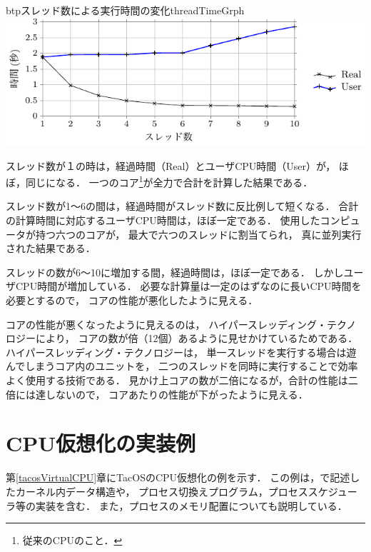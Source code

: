 \begin{myfig}{btp}{スレッド数による実行時間の変化}{threadTimeGrph}
  \includegraphics[scale=1.0]{Tbl/threadTimeGrph.pdf}
\end{myfig}

スレッド数が１の時は，経過時間（Real）とユーザCPU時間（User）が，
ほぼ，同じになる．
一つのコア\footnote{従来のCPUのこと．}が全力で合計を計算した結果である．

スレッド数が1〜6の間は，経過時間がスレッド数に反比例して短くなる．
合計の計算時間に対応するユーザCPU時間は，ほぼ一定である．
使用したコンピュータが持つ六つのコアが，
最大で六つのスレッドに割当てられ，
真に並列実行された結果である．

スレッドの数が6〜10に増加する間，経過時間は，ほぼ一定である．
しかしユーザCPU時間が増加している．
必要な計算量は一定のはずなのに長いCPU時間を必要とするので，
コアの性能が悪化したように見える．

コアの性能が悪くなったように見えるのは，
ハイパースレッディング・テクノロジー\cite{hyperThreading}により，
コアの数が倍（12個）あるように見せかけているためである．
ハイパースレッディング・テクノロジーは，
単一スレッドを実行する場合は遊んでしまうコア内のユニットを，
二つのスレッドを同時に実行することで効率よく使用する技術である．
見かけ上コアの数が二倍になるが，合計の性能は二倍には達しないので，
コアあたりの性能が下がったように見える．


\section{CPU仮想化の実装例}
第\ref{tacosVirtualCPU}章にTacOSのCPU仮想化の例を示す．
この例は，{\cmml}で記述したカーネル内データ構造や，
プロセス切換えプログラム，プロセススケジューラ等の実装を含む．
また，プロセスのメモリ配置についても説明している．
